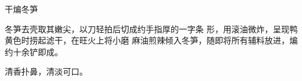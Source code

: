 \begin{recipe}{干煸冬笋}

\ingredients


\cooking

冬笋去壳取其嫩尖，以刀轻拍后切成约手指厚的一字条 形，用滚油微炸，呈现鸭黄色时捞起滤干，在旺火上将小磨 麻油煎辣倾入冬笋，随即将所有辅料放进，煸约十余铲即成。

\notes

清香扑鼻，清淡可口。

\end{recipe}


